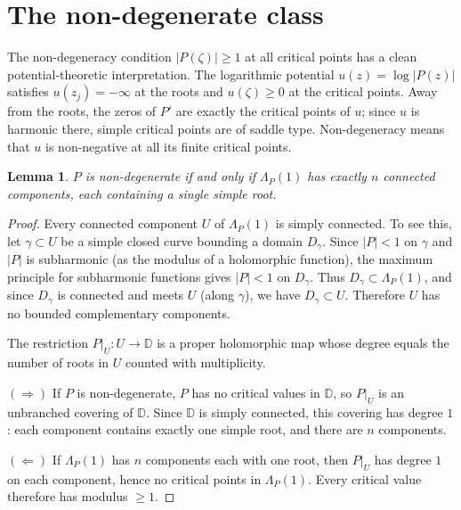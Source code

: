 \documentclass[11pt,a4paper]{amsart}
\newtheorem{lemma}[theorem]{Lemma}
\theoremstyle{definition}
\newcommand{\D}{\mathbb{D}}
\newcommand{\abs}[1]{\lvert #1 \rvert}
\begin{document}
\section{The non-degenerate class}

The non-degeneracy condition $\abs{P(\zeta)} \geq 1$ at all critical points
has a clean potential-theoretic interpretation.  The logarithmic potential
$u(z) = \log\abs{P(z)}$ satisfies $u(z_j) = -\infty$ at the roots
and $u(\zeta) \geq 0$ at the critical points.
Away from the roots, the zeros of $P'$ are exactly the critical points
of $u$; since $u$ is harmonic there, simple critical points are of
saddle type.
Non-degeneracy means that $u$ is non-negative at all its finite
critical points.

\begin{lemma}\label{lem:petals}
$P$ is non-degenerate if and only if $\Lambda_P(1)$ has
exactly $n$ connected components, each containing a single simple root.
\end{lemma}

\begin{proof}
Every connected component $U$ of $\Lambda_P(1)$ is simply connected.
To see this, let $\gamma \subset U$ be a simple closed curve bounding
a domain $D_\gamma$.  Since $\abs{P} < 1$ on $\gamma$ and $\abs{P}$
is subharmonic (as the modulus of a holomorphic function), the maximum
principle for subharmonic functions gives $\abs{P} < 1$ on $D_\gamma$.
Thus $D_\gamma \subset \Lambda_P(1)$, and since $D_\gamma$ is connected
and meets $U$ (along $\gamma$), we have $D_\gamma \subset U$.
Therefore $U$ has no bounded complementary components.

The restriction $P|_U \colon U \to \D$ is a proper holomorphic map
whose degree equals the number of roots in $U$ counted with multiplicity.

$(\Rightarrow)$  If $P$ is non-degenerate, $P$ has no critical values in
$\D$, so $P|_U$ is an unbranched covering of $\D$.  Since $\D$ is simply
connected, this covering has degree $1$: each component contains exactly
one simple root, and there are $n$ components.

$(\Leftarrow)$  If $\Lambda_P(1)$ has $n$ components each with one root,
then $P|_U$ has degree $1$ on each component, hence no critical points
in $\Lambda_P(1)$.  Every critical value therefore has modulus $\geq 1$.
\end{proof}
\end{document}
